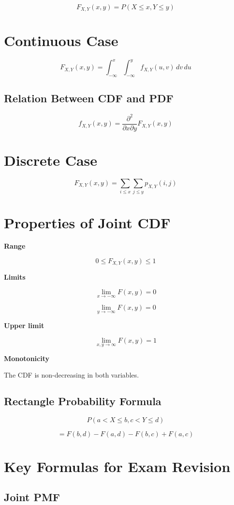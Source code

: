 \documentclass[12pt]{article}
\begin{document}
\[
F_{X,Y}(x,y)=P(X\le x, Y\le y)
\]

\section{Continuous Case}

\[
F_{X,Y}(x,y)=\int_{-\infty}^{x}\int_{-\infty}^{y} f_{X,Y}(u,v)\,dv\,du
\]

\subsection{Relation Between CDF and PDF}

\[
f_{X,Y}(x,y)=
\frac{\partial^2}{\partial x \partial y}
F_{X,Y}(x,y)
\]

\section{Discrete Case}

\[
F_{X,Y}(x,y)=\sum_{i\le x}\sum_{j\le y} p_{X,Y}(i,j)
\]

\section{Properties of Joint CDF}

\textbf{Range}

\[
0 \le F_{X,Y}(x,y) \le 1
\]

\textbf{Limits}

\[
\lim_{x\to -\infty}F(x,y)=0
\]

\[
\lim_{y\to -\infty}F(x,y)=0
\]

\textbf{Upper limit}

\[
\lim_{x,y\to\infty}F(x,y)=1
\]

\textbf{Monotonicity}

The CDF is non-decreasing in both variables.

\subsection{Rectangle Probability Formula}

\[
P(a<X\le b, c<Y\le d)
\]

\[
=F(b,d)-F(a,d)-F(b,c)+F(a,c)
\]

\section{Key Formulas for Exam Revision}

\subsection{Joint PMF}
\end{document}
